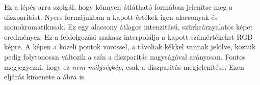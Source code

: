 Ez a lépés arra szolgál, hogy könnyen átlátható formában jelenítse meg a diszparitást.
Nyers formájukban a kapott értékek igen alacsonyak és monokromatikusak.
Ez egy alacsony átlagos intenzitású, szürkeárnyalatos képet eredményez.
Ez a feldolgozási szakasz interpolálja a kapott számértékeket RGB képre.
A képen a közeli pontok vörössel, a távoliak kékkel vannak jelölve, köztük pedig folytonosan változik a szín a diszparitás nagyságával arányosan.
Fontos megjegyezni, hogy ez \emph{nem mélységkép}, csak a diszparitás megjelenítése.
Ezen eljárás kimenete a  ábra is.
